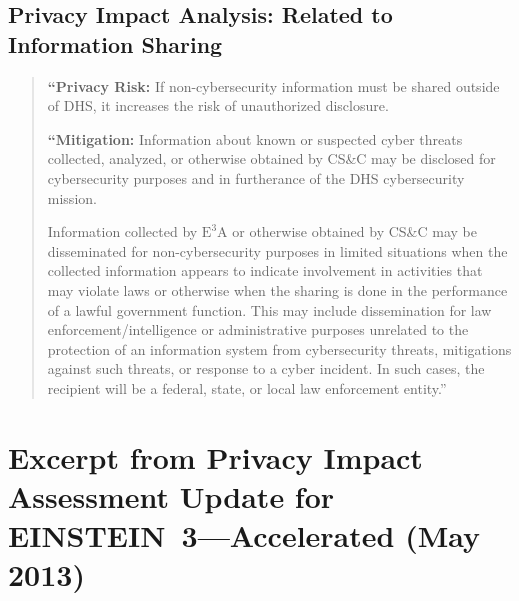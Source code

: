 \documentclass[fleqn,10pt]{wlscirep}
\newcommand{\ETA}{$\textrm{E}^\textrm{3}\textrm{A}$\xspace}
\begin{document}
\subsection{Privacy Impact Analysis: Related to Information Sharing}\label{excerpt3}
\begin{quote}
  \textbf{``Privacy Risk:} If non-cybersecurity information must be shared outside of DHS, it
increases the risk of unauthorized disclosure.

  \textbf{``Mitigation:} Information about known or suspected cyber threats collected,
analyzed, or otherwise obtained by CS\&C may be disclosed for cybersecurity purposes
and in furtherance of the DHS cybersecurity mission.

Information collected by \ETA or otherwise obtained by CS\&C may be
disseminated for non-cybersecurity purposes in limited situations when the collected
information appears to indicate involvement in activities that may violate laws or
otherwise when the sharing is done in the performance of a lawful government function.
This may include dissemination for law enforcement/intelligence or administrative
purposes unrelated to the protection of an information system from cybersecurity threats,
mitigations against such threats, or response to a cyber incident. In such cases, the
recipient will be a federal, state, or local law enforcement entity.''~\cite[p.23]{dhs-e3a-pia}
\end{quote}


\section{Excerpt from Privacy Impact Assessment Update for EINSTEIN~3---Accelerated (May 2013)}
\end{document}
